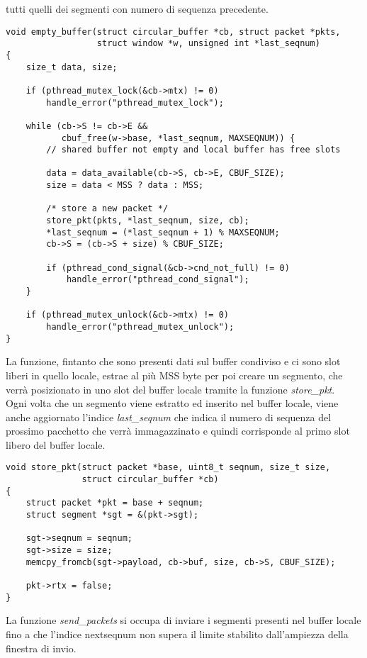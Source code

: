 tutti quelli dei segmenti con numero di sequenza precedente.
%
\begin{lstlisting}[title=transport.c]
void empty_buffer(struct circular_buffer *cb, struct packet *pkts,
                  struct window *w, unsigned int *last_seqnum)
{
    size_t data, size;

    if (pthread_mutex_lock(&cb->mtx) != 0)
        handle_error("pthread_mutex_lock");

    while (cb->S != cb->E && 
           cbuf_free(w->base, *last_seqnum, MAXSEQNUM)) {
        // shared buffer not empty and local buffer has free slots

        data = data_available(cb->S, cb->E, CBUF_SIZE);
        size = data < MSS ? data : MSS;

        /* store a new packet */
        store_pkt(pkts, *last_seqnum, size, cb);
        *last_seqnum = (*last_seqnum + 1) % MAXSEQNUM;
        cb->S = (cb->S + size) % CBUF_SIZE;

        if (pthread_cond_signal(&cb->cnd_not_full) != 0)
            handle_error("pthread_cond_signal");
    }

    if (pthread_mutex_unlock(&cb->mtx) != 0)
        handle_error("pthread_mutex_unlock");
}
\end{lstlisting}
%
La funzione, fintanto che sono presenti dati sul buffer condiviso e ci sono 
slot liberi in quello locale, estrae al più MSS byte per poi creare un segmento,
che verrà posizionato in uno slot del buffer locale tramite la 
funzione \emph{store\_pkt}.\\
Ogni volta che un segmento viene estratto ed inserito nel buffer locale, viene anche 
aggiornato l'indice \emph{last\_seqnum} che indica il numero di sequenza del
prossimo pacchetto che verrà immagazzinato e quindi corrisponde al primo slot
libero del buffer locale.
%
\begin{lstlisting}[title=transport.c]
void store_pkt(struct packet *base, uint8_t seqnum, size_t size,
               struct circular_buffer *cb)
{
    struct packet *pkt = base + seqnum;
    struct segment *sgt = &(pkt->sgt);

    sgt->seqnum = seqnum;
    sgt->size = size;
    memcpy_fromcb(sgt->payload, cb->buf, size, cb->S, CBUF_SIZE);

    pkt->rtx = false;
}
\end{lstlisting}
%
La funzione \emph{send\_packets} si occupa di inviare i segmenti presenti nel
buffer locale fino a che l'indice nextseqnum non supera il limite stabilito
dall'ampiezza della finestra di invio.

